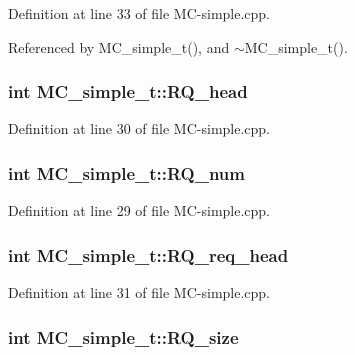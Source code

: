 Definition at line 33 of file MC-simple.cpp.

Referenced by MC\_\-simple\_\-t(), and $\sim$MC\_\-simple\_\-t().
\subsubsection[{RQ\_\-head}]{\setlength{\rightskip}{0pt plus 5cm}int {\bf MC\_\-simple\_\-t::RQ\_\-head}\hspace{0.3cm}{\tt  [protected]}}\label{classMC__simple__t_2a29ce5252a9f0a9833ad1dd66522925}




Definition at line 30 of file MC-simple.cpp.
\subsubsection[{RQ\_\-num}]{\setlength{\rightskip}{0pt plus 5cm}int {\bf MC\_\-simple\_\-t::RQ\_\-num}\hspace{0.3cm}{\tt  [protected]}}\label{classMC__simple__t_5d855deb2f786ea4a761ca1abb0f478a}




Definition at line 29 of file MC-simple.cpp.
\subsubsection[{RQ\_\-req\_\-head}]{\setlength{\rightskip}{0pt plus 5cm}int {\bf MC\_\-simple\_\-t::RQ\_\-req\_\-head}\hspace{0.3cm}{\tt  [protected]}}\label{classMC__simple__t_07e225ce05aa1ee6f915730aec28b5d8}




Definition at line 31 of file MC-simple.cpp.
\subsubsection[{RQ\_\-size}]{\setlength{\rightskip}{0pt plus 5cm}int {\bf MC\_\-simple\_\-t::RQ\_\-size}\hspace{0.3cm}{\tt  [protected]}}\label{classMC__simple__t_fe704983d5686f18e957481fe0946148}




